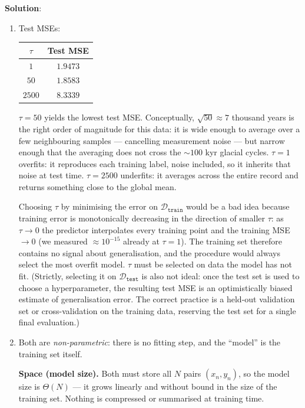 \documentclass[submit]{../harvardml}
\newenvironment{solution}{
    \vspace{2mm}
    \color{blue}\noindent\textbf{Solution}:
}{}
\begin{document}
\begin{solution}
\begin{enumerate}
\begin{enumerate}
\item
Test MSEs:

\begin{center}
\begin{tabular}{cc}
  \hline
  $\tau$ & Test MSE \\
  \hline
  $1$     & $1.9473$ \\
  $50$    & $1.8583$ \\
  $2500$  & $8.3339$ \\
  \hline
\end{tabular}
\end{center}

$\tau = 50$ yields the lowest test MSE. Conceptually, $\sqrt{50} \approx 7$
thousand years is the right order of magnitude for this data: it is wide enough
to average over a few neighbouring samples --- cancelling measurement noise ---
but narrow enough that the averaging does not cross the $\sim 100$ kyr glacial
cycles. $\tau = 1$ overfits: it reproduces each training label, noise included,
so it inherits that noise at test time. $\tau = 2500$ underfits: it averages
across the entire record and returns something close to the global mean.

Choosing $\tau$ by minimising the error on $\mathcal{D}_\texttt{train}$ would be
a bad idea because training error is monotonically decreasing in the direction
of smaller $\tau$: as $\tau \to 0$ the predictor interpolates every training
point and the training MSE $\to 0$ (we measured $\approx 10^{-15}$ already at
$\tau = 1$). The training set therefore contains no signal about
generalisation, and the procedure would always select the most overfit model.
$\tau$ must be selected on data the model has not fit. (Strictly, selecting it
on $\mathcal{D}_\texttt{test}$ is also not ideal: once the test set is used to
choose a hyperparameter, the resulting test MSE is an optimistically biased
estimate of generalisation error. The correct practice is a held-out validation
set or cross-validation on the training data, reserving the test set for a
single final evaluation.)

\item
Both are \emph{non-parametric}: there is no fitting step, and the ``model'' is
the training set itself.

\textbf{Space (model size).} Both must store all $N$ pairs $(x_n, y_n)$, so the
model size is $\Theta(N)$ --- it grows linearly and without bound in the size of
the training set. Nothing is compressed or summarised at training time.


\end{enumerate}
\end{enumerate}
\end{solution}
\end{document}
